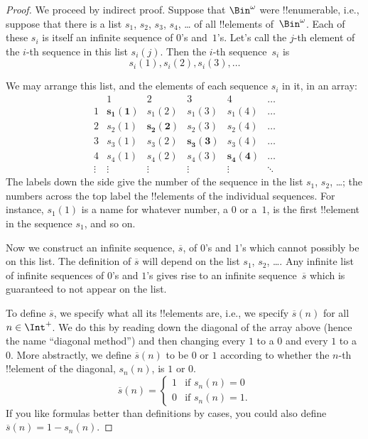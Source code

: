 \documentclass[../../../include/open-logic-section]{subfiles}
\begin{document}
\begin{proof}
We proceed by indirect proof. Suppose that $\Bin^\omega$ were
!!{enumerable}, i.e., suppose that there is a list $s_{1}$, $s_{2}$,
$s_{3}$, $s_{4}$, \dots{} of all !!{element}s of~$\Bin^\omega$.  Each
of these $s_i$ is itself an infinite sequence of $0$'s and~$1$'s.
Let's call the $j$-th element of the $i$-th sequence in this list
$s_i(j)$. Then the $i$-th sequence~$s_i$ is
\[
s_i(1), s_i(2), s_i(3), \dots
\]

We may arrange this list, and the elements of each sequence $s_i$ in
it, in an array:
\[
\begin{array}{c|c|c|c|c|c}
& 1 & 2 & 3 & 4 & \dots \\\hline
1 & \mathbf{s_{1}(1)} & s_{1}(2) & s_{1}(3) & s_1(4) & \dots \\\hline
2 & s_{2}(1)& \mathbf{s_{2}(2)} & s_2(3) & s_2(4) & \dots \\\hline
3 & s_{3}(1)& s_{3}(2) & \mathbf{s_3(3)} & s_3(4) & \dots \\\hline
4 & s_{4}(1)& s_{4}(2) & s_4(3) & \mathbf{s_4(4)} & \dots \\\hline
\vdots & \vdots & \vdots & \vdots & \vdots & \mathbf{\ddots}
\end{array}
\]
The labels down the side give the number of the sequence in the list
$s_1$, $s_2$, \dots; the numbers across the top label the !!{element}s
of the individual sequences. For instance, $s_{1}(1)$ is a name for
whatever number, a $0$ or a~$1$, is the first !!{element} in the
sequence $s_{1}$, and so on.

Now we construct an infinite sequence, $\overline{s}$, of $0$'s and
$1$'s which cannot possibly be on this list.  The definition of
$\overline{s}$ will depend on the list $s_1$, $s_2$, \dots.  Any
infinite list of infinite sequences of $0$'s and $1$'s gives rise to
an infinite sequence~$\overline{s}$ which is guaranteed to not appear
on the list.

To define $\overline{s}$, we specify what all its !!{element}s are,
i.e., we specify $\overline{s}(n)$ for all $n \in \Int^+$.  We do this
by reading down the diagonal of the array above (hence the name
``diagonal method'') and then changing every $1$ to a $0$ and every
$1$ to a~$0$. More abstractly, we define $\overline{s}(n)$ to be $0$
or $1$ according to whether the $n$-th !!{element} of the diagonal,
$s_n(n)$, is $1$ or $0$.
\[
\overline{s}(n) =
\begin{cases}
1 & \text{if $s_{n}(n) = 0$}\\
0 & \text{if $s_{n}(n) = 1$}.
\end{cases}
\]
If you like formulas better than definitions by cases, you could also
define $\overline{s}(n) = 1 - s_n(n)$.


\end{proof}
\end{document}
